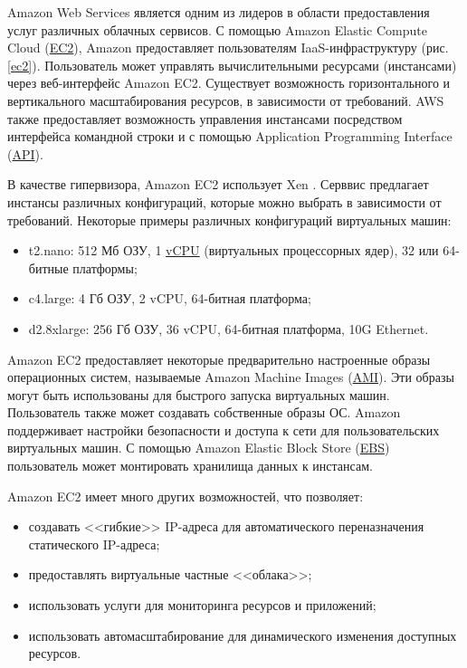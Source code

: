 Amazon Web Services является одним из лидеров в области предоставления услуг различных облачных сервисов.
С помощью Amazon Elastic Compute Cloud (\hyperlink{ec2}{EC2}), Amazon предоставляет пользователям IaaS-инфраструктуру (рис. \ref{ec2}).
Пользователь может управлять вычислительными ресурсами (инстансами) через веб-интерфейс Amazon EC2.
Существует возможность горизонтального и вертикального масштабирования ресурсов, в зависимости от требований.
AWS также предоставляет возможность управления инстансами посредством интерфейса командной строки и с помощью Application Programming Interface (\hyperlink{api}{API}).


В качестве гипервизора, Amazon EC2 использует Xen \cite{xen}.
Серввис предлагает инстансы различных конфигураций, которые можно выбрать в зависимости от требований.
Некоторые примеры различных конфигураций виртуальных машин:
\begin{itemize}
  \item t2.nano: 512 Мб ОЗУ, 1 \hyperlink{vcpu}{vCPU} (виртуальных процессорных ядер), 32 или 64-битные платформы;
  \item c4.large: 4 Гб ОЗУ, 2 vCPU, 64-битная платформа;
  \item d2.8xlarge: 256 Гб ОЗУ, 36 vCPU, 64-битная платформа, 10G Ethernet.
\end{itemize}

Amazon EC2 предоставляет некоторые предварительно настроенные образы операционных систем, называемые Amazon Machine Images (\hyperlink{ami}{AMI}).
Эти образы могут быть использованы для быстрого запуска виртуальных машин.
Пользователь также может создавать собственные образы ОС.
Amazon поддерживает настройки безопасности и доступа к сети для пользовательских виртуальных машин.
С помощью Amazon Elastic Block Store (\hyperlink{ebs}{EBS}) пользователь может монтировать хранилища данных к инстансам.

Amazon EC2 имеет много других возможностей, что позволяет:
\begin{itemize}
  \item создавать <<гибкие>> IP-адреса для автоматического переназначения статического IP-адреса;
  \item предоставлять виртуальные частные <<облака>>;
  \item использовать услуги для мониторинга ресурсов и приложений;
  \item использовать автомасштабирование для динамического изменения доступных ресурсов.
\end{itemize}

